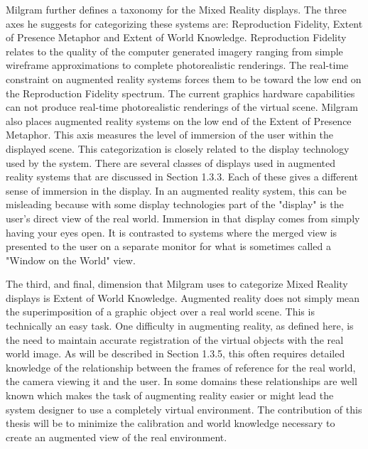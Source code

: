 Milgram further defines a taxonomy for the Mixed Reality displays. The three axes he suggests for categorizing these systems are: Reproduction Fidelity, Extent of Presence Metaphor and Extent of World Knowledge. Reproduction Fidelity relates to the quality of the computer generated imagery ranging from simple wireframe approximations to complete photorealistic renderings. The real-time constraint on augmented reality systems forces them to be toward the low end on the Reproduction Fidelity spectrum. The current graphics hardware capabilities can not produce real-time photorealistic renderings of the virtual scene. Milgram also places augmented reality systems on the low end of the Extent of Presence Metaphor. This axis measures the level of immersion of the user within the displayed scene. This categorization is closely related to the display technology used by the system. There are several classes of displays used in augmented reality systems that are discussed in Section 1.3.3. Each of these gives a different sense of immersion in the display. In an augmented reality system, this can be misleading because with some display technologies part of the "display" is the user's direct view of the real world. Immersion in that display comes from simply having your eyes open. It is contrasted to systems where the merged view is presented to the user on a separate monitor for what is sometimes called a "Window on the World" view.

The third, and final, dimension that Milgram uses to categorize Mixed Reality displays is Extent of World Knowledge. Augmented reality does not simply mean the superimposition of a graphic object over a real world scene. This is technically an easy task. One difficulty in augmenting reality, as defined here, is the need to maintain accurate registration of the virtual objects with the real world image. As will be described in Section 1.3.5, this often requires detailed knowledge of the relationship between the frames of reference for the real world, the camera viewing it and the user. In some domains these relationships are well known which makes the task of augmenting reality easier or might lead the system designer to use a completely virtual environment. The contribution of this thesis will be to minimize the calibration and world knowledge necessary to create an augmented view of the real environment.\cite{CompareAug}